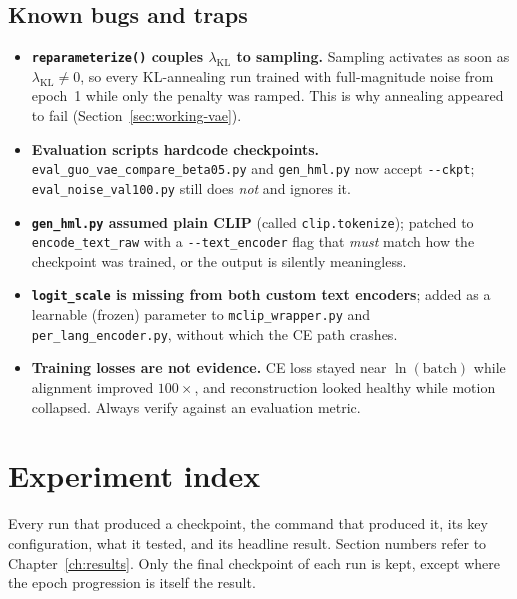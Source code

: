 \documentclass[11pt,a4paper]{report}
\newcommand{\lkl}{\ensuremath{\lambda_{\mathrm{KL}}}}
\begin{document}
\section{Known bugs and traps}
\label{app:bugs}
\begin{itemize}[leftmargin=*]
\item \textbf{\texttt{reparameterize()} couples \lkl{} to sampling.}
 Sampling activates as soon as $\lkl\neq0$, so every KL-annealing run
 trained with full-magnitude noise from epoch~1 while only the penalty was
 ramped. This is why annealing appeared to fail
 (Section~\ref{sec:working-vae}).
\item \textbf{Evaluation scripts hardcode checkpoints.}
 \texttt{eval\_guo\_vae\_compare\_beta05.py} and \texttt{gen\_hml.py} now
 accept \texttt{-{}-ckpt}; \texttt{eval\_noise\_val100.py} still does
 \emph{not} and ignores it.
\item \textbf{\texttt{gen\_hml.py} assumed plain CLIP} (called
 \texttt{clip.tokenize}); patched to \texttt{encode\_text\_raw} with a
 \texttt{-{}-text\_encoder} flag that \emph{must} match how the checkpoint
 was trained, or the output is silently meaningless.
\item \textbf{\texttt{logit\_scale} is missing from both custom text
 encoders}; added as a learnable (frozen) parameter to
 \texttt{mclip\_wrapper.py} and \texttt{per\_lang\_encoder.py}, without
 which the CE path crashes.
\item \textbf{Training losses are not evidence.} CE loss stayed near
 $\ln(\text{batch})$ while alignment improved $100\times$, and
 reconstruction looked healthy while motion collapsed. Always verify
 against an evaluation metric.
\end{itemize}

\chapter{Experiment index}
\label{app:expindex}

Every run that produced a checkpoint, the command that produced it, its key
configuration, what it tested, and its headline result. Section numbers
refer to Chapter~\ref{ch:results}. Only the final checkpoint of each run is
kept, except where the epoch progression is itself the result.
\end{document}
